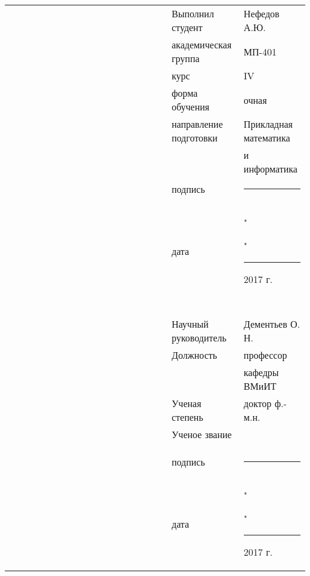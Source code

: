 \documentclass[12pt,a4paper,titlepage]{article}
\theoremstyle{definition}
\theoremstyle{remark}
\begin{document}
\begin{titlepage}
\begin{center}
{\footnotesize
\begin{tabular}[t]{lllllllllllllllllll}
& & & & & & & & & & & & & & & & &   Выполнил студент       &   Нефедов А.Ю.   \\
& & & & & & & & & & & & & & & & &   академическая группа   &   МП-401        \\
& & & & & & & & & & & & & & & & &   курс                   &   IV            \\
& & & & & & & & & & & & & & & & &   форма обучения         &   очная         \\
& & & & & & & & & & & & & & & & &   направление подготовки &   Прикладная математика    \\
& & & & & & & & & & & & & & & & &                          &    и информатика              \\
& & & & & & & & & & & & & & & & &   подпись                &   \rule{3.3cm}{0.01cm}\\
& & & & & & & & & & & & & & & & &                          &                 \\
& & & & & & & & & & & & & & & & &   дата                   &   "\rule{0,7cm}{0.01cm}"\rule{1cm}{0.01cm} 2017 г.\\
& & & & & & & & & & & & & & & & &                          &                 \\
& & & & & & & & & & & & & & & & &                          &                 \\
& & & & & & & & & & & & & & & & &                          &                 \\
& & & & & & & & & & & & & & & & &                          &                 \\
& & & & & & & & & & & & & & & & &                          &                 \\
& & & & & & & & & & & & & & & & &   Научный руководитель   &   Дементьев О. Н.\\
& & & & & & & & & & & & & & & & &   Должность              &   профессор     \\
& & & & & & & & & & & & & & & & &                          &   кафедры ВМиИТ  \\
& & & & & & & & & & & & & & & & &   Ученая степень         &   доктор ф.-м.н.\\
& & & & & & & & & & & & & & & & &   Ученое звание          &                 \\
& & & & & & & & & & & & & & & & &                          &                 \\
& & & & & & & & & & & & & & & & &                          &                 \\
& & & & & & & & & & & & & & & & &   подпись                &  \rule{3.3cm}{0.01cm}\\
& & & & & & & & & & & & & & & & &                          &                 \\
& & & & & & & & & & & & & & & & &   дата                   &  "\rule{0,7cm}{0.01cm}"\rule{1cm}{0.01cm} 2017 г.     \\


\end{tabular}}
\end{center}
\end{titlepage}
\end{document}
